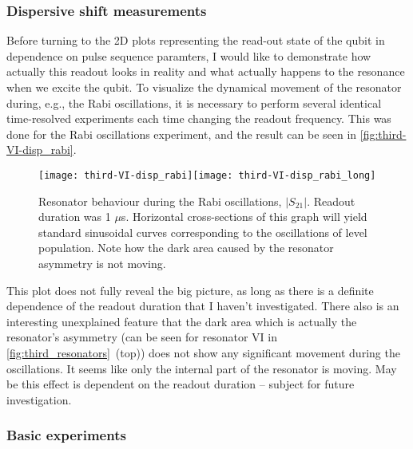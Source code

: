 \documentclass[12pt, twoside]{report}
\numberwithin{equation}{section}
\begin{document}
\subsubsection{Dispersive shift measurements}


Before turning to the 2D plots representing the read-out state of the qubit in dependence on pulse sequence paramters, I would like to demonstrate how actually this readout looks in reality and what actually happens to the resonance when we excite the qubit. To visualize the dynamical movement of the resonator during, e.g., the Rabi oscillations, it is necessary to perform several identical time-resolved experiments each time changing the readout frequency. This was done for the Rabi oscillations experiment, and the result can be seen in \autoref{fig:third-VI-disp_rabi}. 

\begin{figure}[h!]
\texttt{[image: third-VI-disp\_rabi]}\texttt{[image: third-VI-disp\_rabi\_long]}
\caption{Resonator behaviour during the Rabi oscillations, $|S_{21}|$. Readout duration was 1 $\mu$s. Horizontal cross-sections of this graph will yield standard sinusoidal curves corresponding to the oscillations of level population. Note how the dark area caused by the resonator asymmetry is not moving.}
\label{fig:third-VI-disp_rabi}
\end{figure}

This plot does not fully reveal the big picture, as long as there is a definite dependence of the readout duration that I haven't investigated. There also is an interesting unexplained feature that the dark area which is actually the resonator's asymmetry (can be seen for resonator VI in \autoref{fig:third_resonators}~(top)) does not show any significant movement during the oscillations. It seems like only the internal part of the resonator is moving. May be this effect is dependent on the readout duration -- subject for future investigation.


\subsubsection{Basic experiments}
\end{document}
